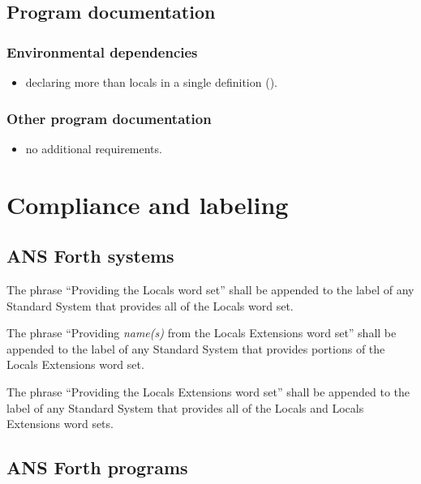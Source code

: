 \subsection{Program documentation} %

\subsubsection{Environmental dependencies} %
\label{locals:environment}
\begin{itemize}
\item declaring more than  locals in a single definition
	().
\end{itemize}

\subsubsection{Other program documentation} %
\begin{itemize}
\item no additional requirements.
\end{itemize}


\section{Compliance and labeling} %

\subsection{ANS Forth systems} %

The phrase ``Providing the Locals word set'' shall be appended to
the label of any Standard System that provides all of the Locals
word set.

The phrase ``Providing \emph{name(s)} from the Locals Extensions
word set'' shall be appended to the label of any Standard System
that provides portions of the Locals Extensions word set.

The phrase ``Providing the Locals Extensions word set'' shall be
appended to the label of any Standard System that provides all of
the Locals and Locals Extensions word sets.

\subsection{ANS Forth programs} %

